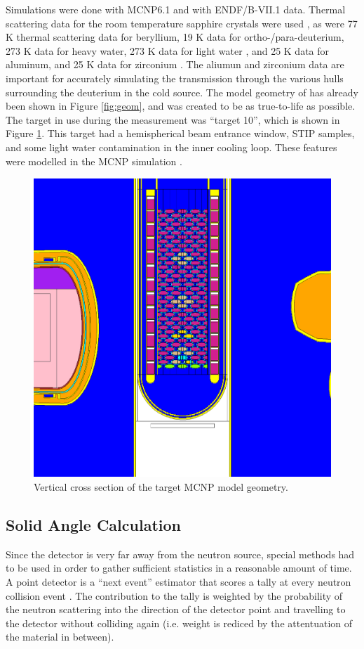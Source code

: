 \documentclass[preprint,12pt]{elsarticle}
\begin{document}
Simulations were done with MCNP6.1 and with ENDF/B-VII.1 data.  Thermal scattering data for the room temperature sapphire crystals were used \cite{sapp}, as were 77 K thermal scattering data for beryllium, 19 K data for ortho-/para-deuterium, 273 K data for heavy water, 273 K data for light water \cite{mcnp6}, and 25 K data for aluminum, and 25 K data for zirconium \cite{IKE}.  The aliumun and zirconium data are important for accurately simulating the transmission through the various hulls surrounding the deuterium in the cold source.  The model geometry of has already been shown in Figure \ref{fig:geom}, and was created to be as true-to-life as possible.  The target in use during the measurement was ``target 10'', which is shown in Figure \ref{fig:target}. This target had a hemispherical beam entrance window, STIP samples, and some light water contamination in the inner cooling loop.  These features were modelled in the MCNP simulation \cite{target10}.

\begin{figure}[h!] 
  \centering
    \includegraphics[width=0.25\columnwidth,trim={5cm 0 5cm 0},clip]{graphics/target.eps}
     \caption{Vertical cross section of the target MCNP model geometry. \label{fig:target}}
\end{figure}


\subsection{Solid Angle Calculation}
\label{subsec:solidangle}

Since the detector is very far away from the neutron source, special methods had to be used in order to gather sufficient statistics in a reasonable amount of time.  A point detector is a ``next event'' estimator that scores a tally at every neutron collision event \cite{mcnp}.  The contribution to the tally is weighted by the probability of the neutron scattering into the direction of the detector point and travelling to the detector without colliding again (i.e. weight is rediced by the attentuation of the material in between).  
\end{document}
